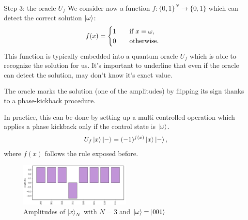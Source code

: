 \documentclass[aspectratio=169, 8pt, xcolor={svgnames}, hyperref={linkcolor=black}]{beamer}
\begin{document}
\begin{frame}{Step 3: the oracle $U_f$}
We consider now a function $f:\{0,1\}^N \to \{0,1\}$ which can detect the correct solution $\ket{\omega}$:
$$ 
f(x) = \begin{cases}
1 \qquad \text{if\,\,} x=\omega, \\
0 \qquad \text{otherwise}.
\end{cases} $$ \pause
This function is typically embedded into a quantum oracle $U_f$ which is able to 
recognize the solution for us. It's important to underline that even if the oracle 
can detect the solution, may don't know it's exact value. \pause

\textcolor{carnelian}{The oracle marks the solution (one of the amplitudes) by flipping its sign thanks to
a phase-kickback procedure.} \pause


\begin{multicols}{2}
In practice, this can be done by setting up a multi-controlled operation 
which applies a phase kickback only if the control state is $\ket{\omega}$.
$$ U_f \ket{x}\ket{-} = (-1)^{f(x)}\ket{x}\ket{-}, $$
where $f(x)$ follows the rule exposed before.
\begin{figure}
   \includegraphics[width=0.5\textwidth]{figures/state2.png}
   \caption*{Amplitudes of $\ket{x}_N$ with $N=3$ and $\ket{\omega} = \ket{001}$}
\end{figure}
\end{multicols}

\end{frame}
\end{document}
